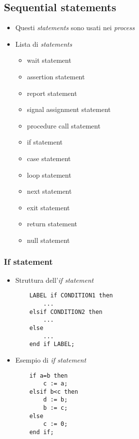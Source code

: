 \documentclass{article}
\begin{document}
\subsection{Sequential statements}
\begin{itemize}
	\item Questi \textit{statements} sono usati nei \textit{process}
	\item Lista di \textit{statements}
	      \begin{itemize}
	      	\item wait statement
	      	\item assertion statement
	      	\item report statement
	      	\item signal assignment statement
	      	\item procedure call statement
	      	\item if statement
	      	\item case statement
	      	\item loop statement
	      	\item next statement
	      	\item exit statement
	      	\item return statement
	      	\item null statement
	      \end{itemize}
\end{itemize}
\subsubsection{If statement}
\begin{itemize}
	\item Struttura dell'\textit{if statement}
	      \begin{verbatim}
    LABEL if CONDITION1 then
        ...
    elsif CONDITION2 then
        ...
    else
        ...
    end if LABEL;
	      \end{verbatim}
	\item Esempio di \textit{if statement}
	      \begin{verbatim}
    if a=b then
        c := a;
    elsif b<c then
        d := b;
        b := c;
    else
        c := 0;
    end if;
	      \end{verbatim}
\end{itemize}
\end{document}

